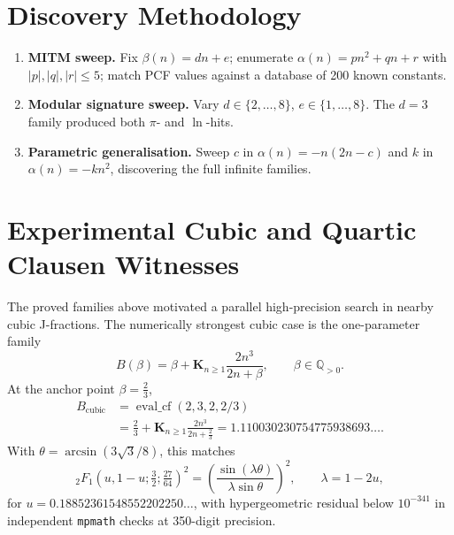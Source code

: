 \documentclass[11pt,a4paper]{article}
\theoremstyle{plain}
\theoremstyle{definition}
\theoremstyle{remark}
\begin{document}
\section{Discovery Methodology}\label{sec:method}

\begin{enumerate}
\item \textbf{MITM sweep.}
  Fix $\beta(n) = dn{+}e$; enumerate
  $\alpha(n) = pn^2{+}qn{+}r$ with $|p|,|q|,|r| \le 5$;
  match PCF values against a database of 200 known constants.
\item \textbf{Modular signature sweep.}
  Vary $d \in \{2,\ldots,8\}$, $e \in \{1,\ldots,8\}$.
  The $d{=}3$ family produced both $\pi$- and $\ln$-hits.
\item \textbf{Parametric generalisation.}
  Sweep $c$ in $\alpha(n) = -n(2n{-}c)$ and $k$ in
  $\alpha(n) = -kn^2$, discovering the full infinite families.
\end{enumerate}

\section{Experimental Cubic and Quartic Clausen Witnesses}\label{sec:exp-cq}

The proved families above motivated a parallel high-precision search in nearby
cubic J-fractions. The numerically strongest cubic case is the one-parameter
family
\[
  B(\beta) = \beta + \mathbf{K}_{n\ge1}\frac{2n^3}{2n+\beta},
  \qquad \beta \in \mathbb{Q}_{>0}.
\]
At the anchor point $\beta=\tfrac{2}{3}$,
\[
\begin{aligned}
  B_{\mathrm{cubic}}
    &= \operatorname{eval\_cf}(2,3,2,2/3)\\
    &= \frac23 + \mathbf{K}_{n\ge1}\frac{2n^3}{2n+\frac23}
     = 1.110030230754775938693\ldots.
\end{aligned}
\]
With $\theta = \arcsin(3\sqrt{3}/8)$, this matches
\[
  {}_2F_1\!\left(u,1-u;\tfrac{3}{2};\tfrac{27}{64}\right)^2
  = \left(\frac{\sin(\lambda\theta)}{\lambda\sin\theta}\right)^2,
  \qquad \lambda = 1-2u,
\]
for $u = 0.18852361548552202250\ldots$, with hypergeometric residual below
$10^{-341}$ in independent \texttt{mpmath} checks at 350-digit precision.
\end{document}
